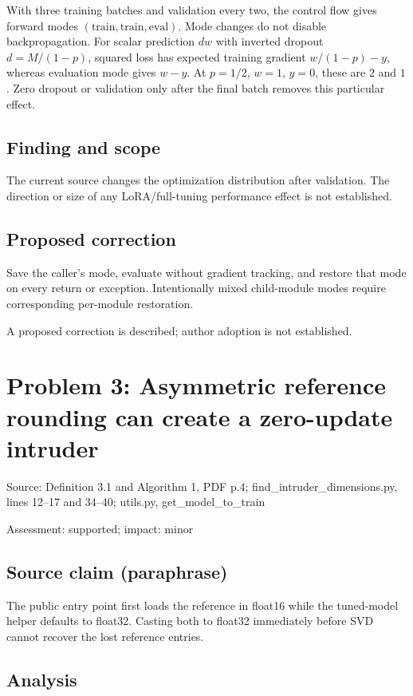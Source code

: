 \documentclass[11pt]{article}
\begin{document}
With three training batches and validation every two, the control flow gives forward modes \((\mathrm{train},\mathrm{train},\mathrm{eval})\). Mode changes do not disable backpropagation. For scalar prediction \(dw\) with inverted dropout \(d=M/(1-p)\), squared loss has expected training gradient \(w/(1-p)-y\), whereas evaluation mode gives \(w-y\). At \(p=1/2\), \(w=1\), \(y=0\), these are \(2\) and \(1\). Zero dropout or validation only after the final batch removes this particular effect.

\subsection*{Finding and scope}

The current source changes the optimization distribution after validation. The direction or size of any LoRA/full-tuning performance effect is not established.

\subsection*{Proposed correction}

Save the caller’s mode, evaluate without gradient tracking, and restore that mode on every return or exception. Intentionally mixed child-module modes require corresponding per-module restoration.

A proposed correction is described; author adoption is not established.

\section*{Problem 3: Asymmetric reference rounding can create a zero-update intruder}

Source: Definition 3.1 and Algorithm 1, PDF p.4; find\_intruder\_dimensions.py, lines 12–17 and 34–40; utils.py, get\_model\_to\_train

Assessment: supported; impact: minor

\subsection*{Source claim (paraphrase)}

The public entry point first loads the reference in float16 while the tuned-model helper defaults to float32. Casting both to float32 immediately before SVD cannot recover the lost reference entries.

\subsection*{Analysis}
\end{document}
